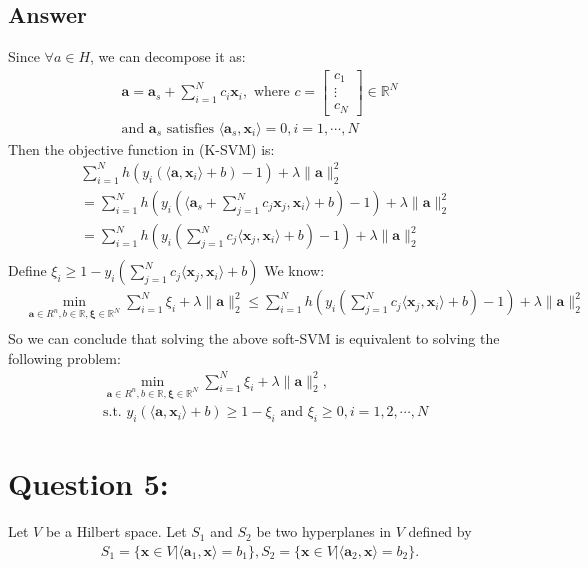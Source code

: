\documentclass[a4paper,12pt]{article}
\newcommand{\R}{\mathbb{R}}
\begin{document}
\subsection*{Answer}
Since \(\forall a \in H\), we can decompose it as:
\begin{align*}
    \bm{a} = \bm{a}_s + \sum_{i=1}^{N}c_i\bm{x}_i, \text{ where } c = \begin{bmatrix}
        c_1 \\
        \vdots \\
        c_N
    \end{bmatrix} \in \R^N \\
    \text{and } \bm{a}_s \text{ satisfies } \langle \bm{a}_s, \bm{x}_i\rangle = 0, i=1, \cdots, N
\end{align*}
Then the objective function in (K-SVM) is:
\begin{align*}
    &\sum_{i=1}^N h(y_i (\langle \bm{a}, \bm{x}_i\rangle + b) - 1) + \lambda\|\bm{a}\|_2^2 \\
    &= \sum_{i=1}^N h(y_i (\langle \bm{a}_s + \sum_{j=1}^N c_j \bm{x}_j, \bm{x}_i\rangle + b) - 1) + \lambda\|\bm{a}\|_2^2 \\
    &= \sum_{i=1}^N h(y_i (\sum_{j=1}^N c_j \langle \bm{x}_j, \bm{x}_i\rangle + b) - 1) +  \lambda\|\bm{a}\|_2^2 \\
\end{align*}
Define \(\xi_i \geq 1 - y_i (\sum_{j=1}^N c_j \langle \bm{x}_j, \bm{x}_i\rangle + b)\)
We know:
\begin{align*}
    &\min_{\bm{a} \in R^n, b \in \R, \bm{\xi} \in \R^N} \sum_{i = 1}^N \xi_i + \lambda\|\bm{a}\|_2^2  \leq \sum_{i=1}^N h(y_i (\sum_{j=1}^N c_j \langle \bm{x}_j, \bm{x}_i\rangle + b) - 1) +  \lambda\|\bm{a}\|_2^2 \\
\end{align*}
So we can conclude that solving the above soft-SVM is equivalent to solving the following problem:
\begin{align*}
    &\min_{\bm{a} \in R^n, b \in \R, \bm{\xi} \in \R^N} \sum_{i = 1}^N \xi_i + \lambda\|\bm{a}\|_2^2, \\
    &\text{s.t. } y_i(\langle \bm{a}, \bm{x}_i\rangle + b) \geq 1 - \xi_i \text{ and } \xi_i \geq 0, i = 1,2,\cdots,N
\end{align*}


\section*{Question 5:}
Let \(V\) be a Hilbert space. Let \(S_1\) and \(S_2\) be two hyperplanes in \(V\) defined by
\begin{align*}
    S_1 = \{\bm{x} \in V | \langle \bm{a}_1, \bm{x}\rangle = b_1\}, S_2 = \{\bm{x} \in V | \langle \bm{a}_2, \bm{x} \rangle = b_2\}.
\end{align*}
\end{document}
